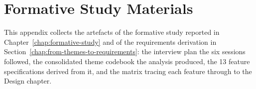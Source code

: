 \chapter{Formative Study Materials}
\label{app:formative-materials}
This appendix collects the artefacts of the formative study reported in Chapter~\ref{chap:formative-study} and of the requirements derivation in Section~\ref{chap:from-themes-to-requirements}: the interview plan the six sessions followed, the consolidated theme codebook the analysis produced, the 13 feature specifications derived from it, and the matrix tracing each feature through to the Design chapter.








